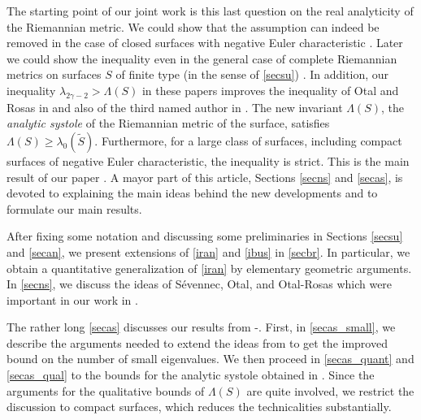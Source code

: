\documentclass[a4paper,11pt]{amsart}
\numberwithin{equation}{section}
\theoremstyle{definition}
\begin{document}
The starting point of our joint work is this last question on the real analyticity of the Riemannian metric.
We could show that the assumption can indeed be removed in the case of closed surfaces with negative Euler characteristic \cite[2016]{BMM1}.
Later we could show the inequality even in the general case of complete Riemannian metrics on surfaces $S$ of finite type (in the sense of \cref{secsu}) \cite[2017]{BMM2}. 
In addition, our inequality $\lambda_{2\gamma-2}>\Lambda(S)$ in these papers improves the inequality of Otal and Rosas in \cite{OR} and also of the third named author in \cite{Mo}.
The new invariant $\Lambda(S)$, the \emph{analytic systole} of the Riemannian metric of the surface, satisfies $\Lambda(S)\ge\lambda_0(\tilde S)$.
Furthermore, for a large class of surfaces, including compact surfaces of negative Euler characteristic, the inequality is strict.
This is the main result of our paper \cite{BMM3}.
A mayor part of this article, Sections \ref{secns} and \ref{secas}, is devoted to explaining the main ideas behind the new developments and to formulate our main results. 

After fixing some notation and discussing some preliminaries in Sections \ref{secsu} and \ref{secan}, we present extensions of \cref{iran} and \cref{ibus} in \cref{secbr}.
In particular, we obtain a quantitative generalization of \cref{iran} by elementary geometric arguments.
In \cref{secns}, we discuss the ideas of S\'evennec, Otal, and Otal-Rosas which were important in our work in \cite{BMM1,BMM2}.

The rather long \cref{secas} discusses our results from \cite{BMM1}-\cite{BMM3}.
First, in \cref{secas_small}, we describe the arguments needed to extend the ideas from \cite{OR} to get the improved bound on the number of small eigenvalues.
We then proceed in \cref{secas_quant} and \cref{secas_qual} to the bounds for the analytic systole obtained in \cite{BMM3}.
Since the arguments for the qualitative bounds of $\Lambda(S)$ are quite involved, we restrict the discussion to compact surfaces, which reduces the technicalities substantially.
 
\end{document}
